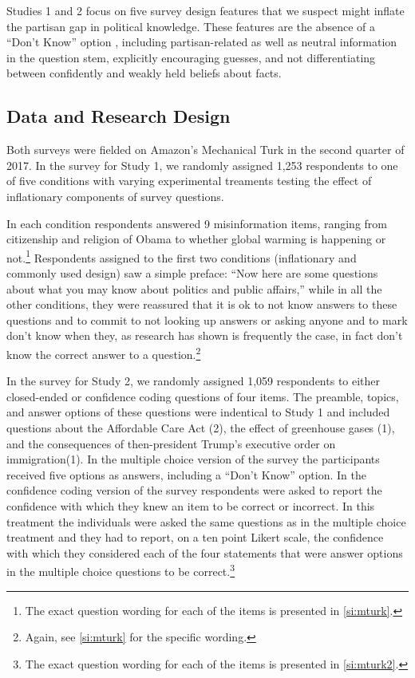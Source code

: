 \documentclass[12pt, letterpaper]{article}
\begin{document}
Studies 1 and 2 focus on five survey design features that we suspect might inflate the partisan gap in political knowledge. These features are the absence of a ``Don't Know'' option%
, including partisan-related as well as neutral information in the question stem, explicitly encouraging guesses, and not differentiating between confidently and weakly held beliefs about facts.

\subsection*{Data and Research Design}\label{sec:data}

Both surveys were fielded on Amazon's Mechanical Turk \citep{BerinskyHuberLenz2012} in the second quarter of 2017. In the survey for Study 1, we randomly assigned 1,253 respondents to one of five conditions with varying experimental treaments testing the effect of inflationary components of survey questions.

In each condition respondents answered 9 misinformation items, ranging from citizenship and religion of Obama to whether global warming is happening or not.\footnote{The exact question wording for each of the items is presented in \cref{si:mturk}.} Respondents assigned to the first two conditions (inflationary and commonly used design) saw a simple preface: ``Now here are some questions about what you may know about politics and public affairs,'' while in all the other conditions, they were reassured that it is ok to not know answers to these questions and to commit to not looking up answers or asking anyone and to mark don't know when they, as research has shown is frequently the case, in fact don’t know the correct answer to a question.\footnote{Again, see \cref{si:mturk} for the specific wording.}

In the survey for Study 2, we randomly assigned 1,059 respondents to either closed-ended or confidence coding questions of four items. The preamble, topics, and answer options of these questions were indentical to Study 1 and included questions about the Affordable Care Act (2), the effect of greenhouse gases (1), and the consequences of then-president Trump's executive order on immigration(1). In the multiple choice version of the survey the participants received five options as answers, including a ``Don't Know'' option. In the confidence coding version of the survey respondents were asked to report the confidence with which they knew an item to be correct or incorrect. In this treatment the individuals were asked the same questions as in the multiple choice treatment and they had to report, on a ten point Likert scale, the confidence with which they considered each of the four statements that were answer options in the multiple choice questions to be correct.\footnote{The exact question wording for each of the items is presented in \cref{si:mturk2}.}
\end{document}
